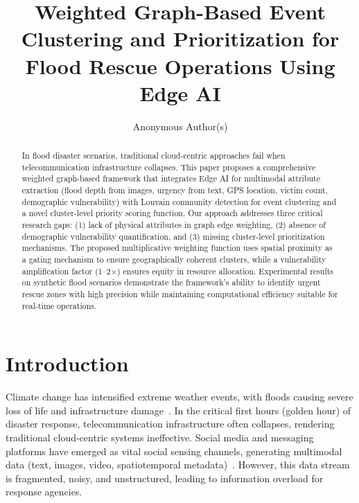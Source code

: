 \documentclass[runningheads]{llncs}
\begin{document}
\title{Weighted Graph-Based Event Clustering and Prioritization for Flood Rescue Operations Using Edge AI}


\author{Anonymous Author(s)}



\maketitle

\begin{abstract}
In flood disaster scenarios, traditional cloud-centric approaches fail when telecommunication infrastructure collapses. This paper proposes a comprehensive weighted graph-based framework that integrates Edge AI for multimodal attribute extraction (flood depth from images, urgency from text, GPS location, victim count, demographic vulnerability) with Louvain community detection for event clustering and a novel cluster-level priority scoring function. Our approach addresses three critical research gaps: (1) lack of physical attributes in graph edge weighting, (2) absence of demographic vulnerability quantification, and (3) missing cluster-level prioritization mechanisms. The proposed multiplicative weighting function uses spatial proximity as a gating mechanism to ensure geographically coherent clusters, while a vulnerability amplification factor (1--2×) ensures equity in resource allocation. Experimental results on synthetic flood scenarios demonstrate the framework's ability to identify urgent rescue zones with high precision while maintaining computational efficiency suitable for real-time operations.

\end{abstract}

\section{Introduction}

Climate change has intensified extreme weather events, with floods causing severe loss of life and infrastructure damage~\cite{alam2018crisismmd}. In the critical first hours (golden hour) of disaster response, telecommunication infrastructure often collapses, rendering traditional cloud-centric systems ineffective. Social media and messaging platforms have emerged as vital social sensing channels, generating multimodal data (text, images, video, spatiotemporal metadata)~\cite{ofli2020multimodal}. However, this data stream is fragmented, noisy, and unstructured, leading to information overload for response agencies.
\end{document}
